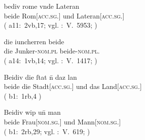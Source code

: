 \begin{exe}
\ex \label{ex:beidkcalem}
	\begin{xlist}
	\ex \gll bediv rome vnde Lateran \\ %
		     beide Rom[\textsc{acc.sg.\NeutI}] und
		     Lateran[\textsc{acc.sg.\MascI}] \\
		\trans {}
			(%
				a11:~2vb,17; vgl.
				\KC:~V.~5953;
				\cite[191]{schroeder1895}%
			)

	\ex \gll die iuncherren beide \\ %
		     die Junker-\textsc{nom.pl} beide-\textsc{nom.pl.\MascM} \\
		\trans {}
			(%
				a14:~1vb,14; vgl.
				\KC:~V.~1417;
				\cite[107]{schroeder1895}%
			)

	\ex \gll Beidiv die ſtat n̄ daz lan \\ %
		     beide die Stadt[\textsc{acc.sg.\FemI}] und das
		     Land[\textsc{acc.sg.\NeutI}] \\
		\trans {}
			(%
				b1:~1rb,4%
			)

	\ex \gll Beidiv wip un̄ man \\ %
		     beide Frau[\textsc{nom.sg.\NeutF}] und
		     Mann[\textsc{nom.sg.\MascM}] \\
		\trans {}
			(%
				b1:~2rb,29; vgl.
				\KC:~V.~619;
				\cite[92]{schroeder1895}%
			)
\end{xlist}
\end{exe}
